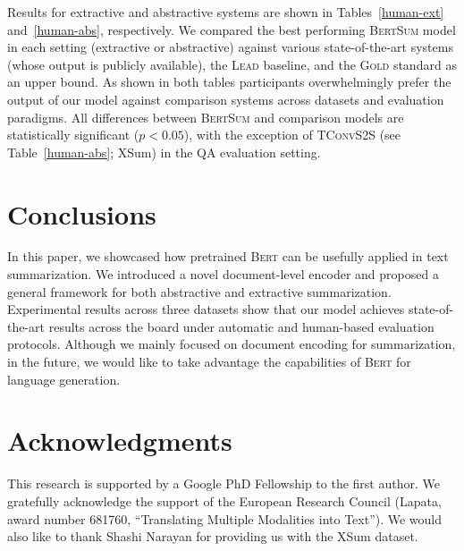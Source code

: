 \documentclass[11pt,a4paper]{article}
\begin{document}
    
    Results for extractive and abstractive systems are shown in
    Tables~\ref{human-ext} and~\ref{human-abs}, respectively.  We compared
    the best performing \textsc{BertSum} model in each setting (extractive
    or abstractive) against various state-of-the-art systems (whose output
    is publicly available), the \textsc{Lead} baseline, and the
    \textsc{Gold} standard as an upper bound. As shown in both tables
    participants overwhelmingly prefer the output of our model against
    comparison systems across datasets and evaluation paradigms. All
    differences between \textsc{BertSum} and comparison models are
    statistically significant (\mbox{$p<0.05$}), with the exception of
    \textsc{TConvS2S} (see Table~\ref{human-abs}; XSum) in the QA
    evaluation setting.
    
    
    
    \section{Conclusions}
    \label{sec:conclusions}
    
    
    
    In this paper, we showcased how pretrained \textsc{Bert} can be
    usefully applied in text summarization. We introduced a novel
    document-level encoder and proposed a general framework for both
    abstractive and extractive summarization. Experimental results across
    three datasets show that our model achieves state-of-the-art results
    across the board under automatic and human-based evaluation
    protocols. Although we mainly focused on document encoding for
    summarization, in the future, we would like to take advantage the
    capabilities of \textsc{Bert} for language generation.
    


    


    


      \section*{Acknowledgments} This research is supported by a Google
    PhD Fellowship to the first author.  We gratefully acknowledge the
    support of the European Research Council (Lapata, award number
    681760, ``Translating Multiple Modalities into Text'').  We would
    also like to thank Shashi Narayan for providing us with the XSum dataset.
    
    \newpage
    
    
    

    
    
\end{document}
